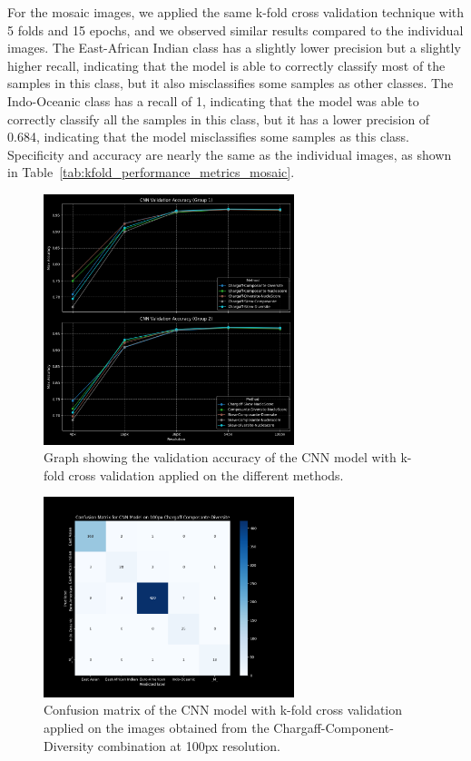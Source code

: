 For the mosaic images, we applied the same k-fold cross validation technique with 5 folds and 15 epochs, and we observed similar results compared to the
individual images. The East-African Indian class has a slightly lower precision but a slightly higher recall, indicating that the model is able to
correctly classify most of the samples in this class, but it also misclassifies some samples as other classes. The Indo-Oceanic class has a recall of 1,
indicating that the model was able to correctly classify all the samples in this class, but it has a lower precision of 0.684, indicating that the model
misclassifies some samples as this class. Specificity and accuracy are nearly the same as the individual images, as shown in
Table~\ref{tab:kfold_performance_metrics_mosaic}.

\begin{figure}[H]
	\centering
	\includegraphics[width=0.65\textwidth]{../imgs/graphs/kfold/cnn_validation_accuracy_groups_mask_5_kfold_std.png}
	\caption{Graph showing the validation accuracy of the CNN model with k-fold cross validation applied on the different methods.}
	\label{fig:kfold_accuracy}
\end{figure}

\begin{figure}[H]
	\centering
	\includegraphics[width=0.65\textwidth]{../imgs/graphs/kfold/cnn_confusion_matrix_100px_mask_5-kfold_std.png}
	\caption{Confusion matrix of the CNN model with k-fold cross validation applied on the images obtained from the Chargaff-Component-Diversity
		combination at 100px resolution.}
	\label{fig:kfold_confusion_matrix}
\end{figure}

